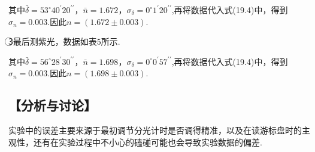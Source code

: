 \documentclass[12pt,a4paper,UTF8]{ctexart}
\begin{document}
\begin{table}[htbp]
\centering
\caption{最小偏向角法测折射率数据表——黄光}
\end{table}
\par
其中$\bar\delta=53^{\circ}40^{\prime}20^{\prime \prime}$，$\bar n=1.672$，$\sigma_{\delta}=0^{\circ}1^{\prime}20^{\prime \prime}$,再将数据代入式(19.4)中，得到$\sigma_n=0.003$.因此$n=(1.672\pm0.003)$.\par	
\textcircled{3}最后测紫光，数据如表5所示.
\newpage
\begin{table}[htbp]
\centering
\caption{最小偏向角法测折射率数据表——紫光}
\end{table}
\par
其中$\bar\delta=56^{\circ}28^{\prime}30^{\prime \prime}$，$\bar n=1.698$，$\sigma_{\delta}=0^{\circ}0^{\prime}57^{\prime \prime}$,再将数据代入式(19.4)中，得到$\sigma_n=0.003$.因此$n=(1.698\pm0.003)$.\par	
\subsection*{【分析与讨论】}
实验中的误差主要来源于最初调节分光计时是否调得精准，以及在读游标盘时的主观性，还有在实验过程中不小心的磕碰可能也会导致实验数据的偏差.
	
	
	
	
\end{document}

